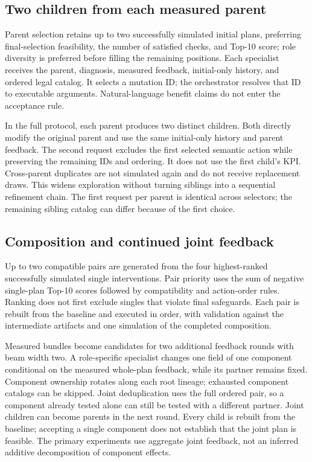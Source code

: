 \documentclass[11pt]{article}
\begin{document}
\subsection{Two children from each measured parent}\label{sec:children}
Parent selection retains up to two successfully simulated initial plans, preferring final-selection feasibility, the number of satisfied checks, and Top-10 score; role diversity is preferred before filling the remaining positions. Each specialist receives the parent, diagnosis, measured feedback, initial-only history, and ordered legal catalog. It selects a mutation ID; the orchestrator resolves that ID to executable arguments. Natural-language benefit claims do not enter the acceptance rule.

In the full protocol, each parent produces two distinct children. Both directly modify the original parent and use the same initial-only history and parent feedback. The second request excludes the first selected semantic action while preserving the remaining IDs and ordering. It does not use the first child's KPI. Cross-parent duplicates are not simulated again and do not receive replacement draws. This widens exploration without turning siblings into a sequential refinement chain. The first request per parent is identical across selectors; the remaining sibling catalog can differ because of the first choice.

\subsection{Composition and continued joint feedback}\label{sec:search}
Up to two compatible pairs are generated from the four highest-ranked successfully simulated single interventions. Pair priority uses the sum of negative single-plan Top-10 scores followed by compatibility and action-order rules. Ranking does not first exclude singles that violate final safeguards. Each pair is rebuilt from the baseline and executed in order, with validation against the intermediate artifacts and one simulation of the completed composition.

Measured bundles become candidates for two additional feedback rounds with beam width two. A role-specific specialist changes one field of one component conditional on the measured whole-plan feedback, while its partner remains fixed. Component ownership rotates along each root lineage; exhausted component catalogs can be skipped. Joint deduplication uses the full ordered pair, so a component already tested alone can still be tested with a different partner. Joint children can become parents in the next round. Every child is rebuilt from the baseline; accepting a single component does not establish that the joint plan is feasible. The primary experiments use aggregate joint feedback, not an inferred additive decomposition of component effects.
\end{document}
